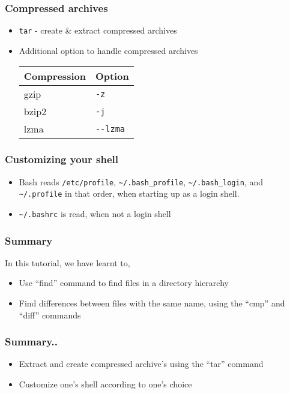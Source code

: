 \documentclass[17pt,compress]{beamer}
\begin{document}
\begin{frame}[fragile]
  \frametitle{Compressed archives}
  \begin{itemize}
  \item \texttt{tar} - create \& extract compressed archives
  \item Additional option to handle compressed archives
    \begin{center}
      \begin{tabular}{|l|l|}\hline
        Compression      &  Option   \\\hline
        gzip   &  \texttt{-z}        \\\hline
        bzip2  &  \texttt{-j}        \\\hline
        lzma   &  \texttt{-{}-lzma}  \\\hline
      \end{tabular}
    \end{center}
  \end{itemize}
\end{frame}


\begin{frame}
\frametitle{Customizing your shell}
\begin{itemize}
\item Bash reads \texttt{/etc/profile},
  \texttt{\textasciitilde{}/.bash\_profile},
  \texttt{\textasciitilde{}/.bash\_login}, and
  \texttt{\textasciitilde{}/.profile} in that order, when starting
  up as a login shell. 
\item \texttt{\textasciitilde{}/.bashrc} is read, when not a login
  shell 
\end{itemize}
\end{frame}


\begin{frame}
\frametitle{Summary}
\label{sec-8}

  In this tutorial, we have learnt to,


\begin{itemize}
\item Use ``find'' command to find files in a directory hierarchy
\item Find differences between files with the same name, using the
    ``cmp'' and ``diff'' commands
\end{itemize}
\end{frame}

\begin{frame}
\frametitle{Summary..}
\label{sec-8}

\begin{itemize}
\item Extract and create compressed archive's using the ``tar'' command
\item Customize one's shell according to one's choice
\end{itemize}
\end{frame}
\end{document}
